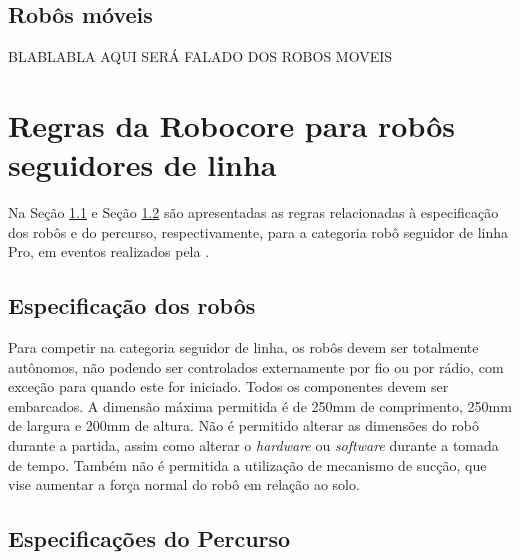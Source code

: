 \vspace{1cm}
\subsection{Robôs móveis}

  BLABLABLA AQUI SERÁ FALADO DOS ROBOS MOVEIS










\vspace{1cm}
\section{Regras da Robocore para robôs seguidores de linha} \label{cap:regras_comp}

Na Seção \ref{cap:espc_robocore} e Seção \ref{cap:perc_robocore} são apresentadas as regras relacionadas à 
especificação dos robôs e do percurso, respectivamente, 
para a categoria robô seguidor de linha Pro, em eventos realizados pela .

\vspace{1cm}
\subsection{Especificação dos robôs} \label{cap:espc_robocore}

Para competir na categoria seguidor de linha, os robôs devem ser totalmente autônomos, não podendo ser controlados 
externamente por fio ou por rádio, com exceção para quando este for iniciado. Todos os componentes devem ser embarcados. A 
dimensão máxima permitida é de 250mm   de   comprimento,   250mm   de   largura   e   200mm   de   altura. Não é 
permitido alterar as dimensões do robô durante a partida, assim como alterar o \textit{hardware} ou \textit{software} 
durante a tomada de tempo. Também não é permitida a utilização de mecanismo de sucção, 
que vise aumentar a força normal do robô em relação ao solo.

\vspace{1cm}
\subsection{Especificações do Percurso} \label{cap:perc_robocore}

